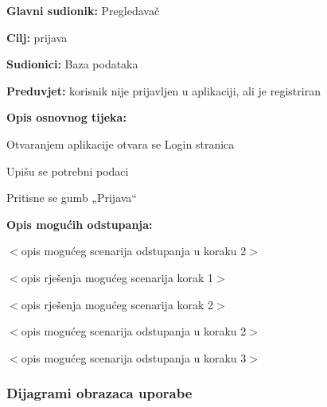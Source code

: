 	\noindent {}
\begin{packed_item}
	
	\item \textbf{Glavni sudionik: }Pregledavač
	\item  \textbf{Cilj:} prijava
	\item  \textbf{Sudionici:}
	Baza podataka
	\item  \textbf{Preduvjet:} korisnik nije prijavljen u aplikaciji, ali je registriran
	\item  \textbf{Opis osnovnog tijeka:}
	
	\item[] \begin{packed_enum}
		
		\item	Otvaranjem aplikacije otvara se Login stranica
		\item	Upišu se potrebni podaci
		\item	Pritisne se gumb „Prijava“
		
	\end{packed_enum}
	
	\item  \textbf{Opis mogućih odstupanja:}
	
	\item[] \begin{packed_item}
		
		\item[2.a] $<$opis mogućeg scenarija odstupanja u koraku 2$>$
		\item[] \begin{packed_enum}
			
			\item $<$opis rješenja mogućeg scenarija korak 1$>$
			\item $<$opis rješenja mogućeg scenarija korak 2$>$
			
		\end{packed_enum}
		\item[2.b] $<$opis mogućeg scenarija odstupanja u koraku 2$>$
		\item[3.a] $<$opis mogućeg scenarija odstupanja  u koraku 3$>$
		
	\end{packed_item}
\end{packed_item}
				
					
				\subsubsection{Dijagrami obrazaca uporabe}
					
